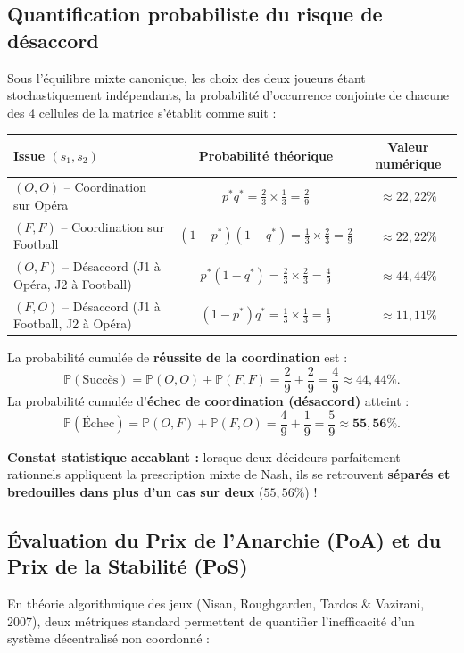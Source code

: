 \documentclass[11pt,a4paper]{article}
\begin{document}
\subsection{Quantification probabiliste du risque de désaccord}
Sous l'équilibre mixte canonique, les choix des deux joueurs étant stochastiquement indépendants, la probabilité d'occurrence conjointe de chacune des 4 cellules de la matrice s'établit comme suit :
\begin{center}
\small
\renewcommand{\arraystretch}{1.3}
\begin{tabular}{lcc}
\toprule
\textbf{Issue $(s_1, s_2)$} & \textbf{Probabilité théorique} & \textbf{Valeur numérique} \\
\midrule
$(O, O)$ -- Coordination sur Opéra & $p^* q^* = \frac{2}{3} \times \frac{1}{3} = \frac{2}{9}$ & $\approx 22{,}22\%$ \\
$(F, F)$ -- Coordination sur Football & $(1-p^*)(1-q^*) = \frac{1}{3} \times \frac{2}{3} = \frac{2}{9}$ & $\approx 22{,}22\%$ \\
$(O, F)$ -- Désaccord (J1 à Opéra, J2 à Football) & $p^*(1-q^*) = \frac{2}{3} \times \frac{2}{3} = \frac{4}{9}$ & $\approx 44{,}44\%$ \\
$(F, O)$ -- Désaccord (J1 à Football, J2 à Opéra) & $(1-p^*)q^* = \frac{1}{3} \times \frac{1}{3} = \frac{1}{9}$ & $\approx 11{,}11\%$ \\
\bottomrule
\end{tabular}
\end{center}

La probabilité cumulée de \textbf{réussite de la coordination} est :
\begin{equation}
\mathbb{P}(\text{Succès}) = \mathbb{P}(O, O) + \mathbb{P}(F, F) = \frac{2}{9} + \frac{2}{9} = \frac{4}{9} \approx 44{,}44\%.
\end{equation}
La probabilité cumulée d'\textbf{échec de coordination (désaccord)} atteint :
\begin{equation}
\mathbb{P}(\text{Échec}) = \mathbb{P}(O, F) + \mathbb{P}(F, O) = \frac{4}{9} + \frac{1}{9} = \frac{5}{9} \approx \mathbf{55{,}56\%}.
\end{equation}

\textbf{Constat statistique accablant :} lorsque deux décideurs parfaitement rationnels appliquent la prescription mixte de Nash, ils se retrouvent \textbf{séparés et bredouilles dans plus d'un cas sur deux} ($55{,}56\%$) !

\subsection{Évaluation du Prix de l'Anarchie (PoA) et du Prix de la Stabilité (PoS)}
En théorie algorithmique des jeux (Nisan, Roughgarden, Tardos \& Vazirani, 2007), deux métriques standard permettent de quantifier l'inefficacité d'un système décentralisé non coordonné :
\end{document}
